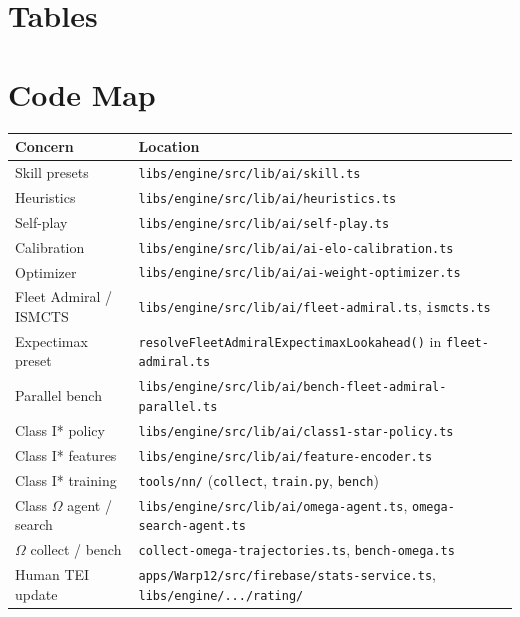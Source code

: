 \documentclass[11pt,letterpaper]{article}
\begin{document}
\section{Tables}





\section{Code Map}

\begin{table}[h]
\centering
\small
\begin{tabular}{@{}ll@{}}
\toprule
\textbf{Concern} & \textbf{Location} \\
\midrule
Skill presets & \texttt{libs/engine/src/lib/ai/skill.ts} \\
Heuristics & \texttt{libs/engine/src/lib/ai/heuristics.ts} \\
Self-play & \texttt{libs/engine/src/lib/ai/self-play.ts} \\
Calibration & \texttt{libs/engine/src/lib/ai/ai-elo-calibration.ts} \\
Optimizer & \texttt{libs/engine/src/lib/ai/ai-weight-optimizer.ts} \\
Fleet Admiral / ISMCTS & \texttt{libs/engine/src/lib/ai/fleet-admiral.ts}, \texttt{ismcts.ts} \\
Expectimax preset & \texttt{resolveFleetAdmiralExpectimaxLookahead()} in \texttt{fleet-admiral.ts} \\
Parallel bench & \texttt{libs/engine/src/lib/ai/bench-fleet-admiral-parallel.ts} \\
Class I* policy & \texttt{libs/engine/src/lib/ai/class1-star-policy.ts} \\
Class I* features & \texttt{libs/engine/src/lib/ai/feature-encoder.ts} \\
Class I* training & \texttt{tools/nn/} (\texttt{collect}, \texttt{train.py}, \texttt{bench}) \\
Class $\Omega$ agent / search & \texttt{libs/engine/src/lib/ai/omega-agent.ts}, \texttt{omega-search-agent.ts} \\
$\Omega$ collect / bench & \texttt{collect-omega-trajectories.ts}, \texttt{bench-omega.ts} \\
Human TEI update & \texttt{apps/Warp12/src/firebase/stats-service.ts}, \texttt{libs/engine/.../rating/} \\

\end{tabular}
\end{table}
\end{document}
